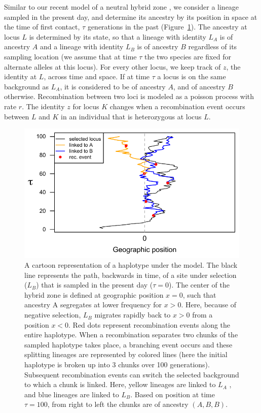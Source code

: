 \documentclass[11pt,letterpaper]{article}
\begin{document}
Similar to our recent model of a neutral hybrid zone \cite{Sedghifar2015}, we consider a lineage sampled in the present day, and determine its ancestry by its position in space at the time of first contact, $\tau$ generations in the past (Figure~\ref{Fig:schematic}). 
The ancestry at locus $L$ is determined by its state, so that a lineage with identity $L_A$ is of ancestry $A$ and a lineage with identity $L_B$ is of ancestry $B$ regardless of its sampling location (we assume that at time $\tau$ the two species are fixed for alternate alleles at this locus). 
For every other locus, we keep track of $z$, the identity at $L$, across time and space. If at time $\tau$ a locus is on the same background as $L_A$, it is considered to be of ancestry $A$, and of ancestry $B$ otherwise. Recombination between two loci is modeled as a poisson process with rate $r$. The identity $z$ for locus $K$ changes when a recombination event occurs between $L$ and $K$ in an individual that is heterozygous at locus $L$. 

\begin{figure}
\includegraphics{figs/BM_schematic}
\caption{A cartoon representation of a haplotype under the model. The black line represents the path, backwards in time, of a site under selection ($L_B$) that is sampled in the present day ($\tau=0$). The center of the hybrid zone is defined at geographic position $x=0$, such that ancestry A segregates at lower frequency for $x>0$. Here, because of negative selection, $L_B$ migrates rapidly back to $x>0$ from a position $x<0$. Red dots represent recombination events along the entire haplotype. When a recombination separates two chunks of the sampled haplotype takes place, a branching event occurs and these splitting lineages are represented by colored lines (here the initial haplotype is broken up into 3 chunks over 100 generations). Subsequent recombination events can switch the selected background to which a chunk is linked.  Here, yellow lineages are linked to $L_A$ , and blue lineages are linked to $L_B$. Based on position at time $\tau=100$, from right to left the chunks are of ancestry $(A,B,B)$.}\label{Fig:schematic}
\end{figure}
\end{document}
